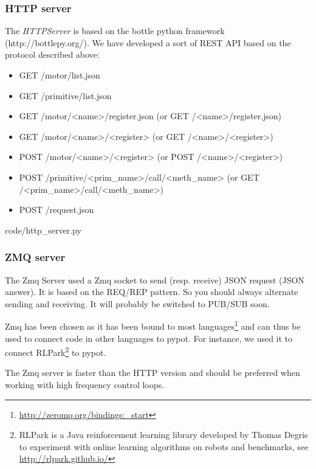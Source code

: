 \subsubsection{HTTP server} %

The \emph{HTTPServer }is based on the bottle python framework (http://bottlepy.org/). We have developed a sort of REST API based on the protocol described above:

\begin{itemize}
    \item GET /motor/list.json
    \item GET /primitive/list.json
    \item GET /motor/<name>/register.json (or GET /<name>/register.json)
    \item GET /motor/<name>/<register> (or GET /<name>/<register>)
    \item POST /motor/<name>/<register> (or POST /<name>/<register>)
    \item POST /primitive/<prim\_name>/call/<meth\_name> (or GET /<prim\_name>/call/<meth\_name>)
    \item POST /request.json
\end{itemize}



    {code/http_server.py}


\subsubsection{ZMQ server} %

The Zmq Server used a Zmq socket to send (resp. receive) JSON request (JSON answer). It is based on the REQ/REP pattern. So you should always alternate sending and receiving. It will probably be switched to PUB/SUB soon.

Zmq has been chosen as it has been bound to most languages\footnote{\url{http://zeromq.org/bindings:_start}} and can thus be used to connect code in other languages to pypot. For instance, we used it to connect RLPark\footnote{RLPark is a Java reinforcement learning library developed by Thomas Degris to experiment with online learning algorithms on robots and benchmarks, see \url{http://rlpark.github.io/}} to pypot.

The Zmq server is faster than the HTTP version and should be preferred when working with high frequency control loops.

